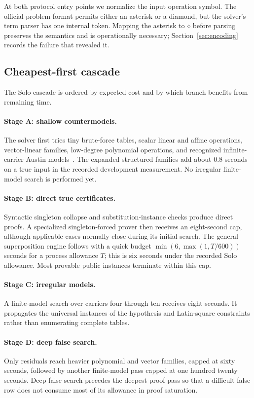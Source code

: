 \documentclass[10pt,twocolumn]{article}
\newcommand{\op}{\mathbin{\diamond}}
\begin{document}
At both protocol entry points we normalize the input operation symbol.  The
official problem format permits either an asterisk or a diamond, but the
solver's term parser has one internal token.  Mapping the asterisk to
$\op$ before parsing preserves the semantics and is operationally necessary;
Section~\ref{sec:encoding} records the failure that revealed it.

\subsection{Cheapest-first cascade}

The Solo cascade is ordered by expected cost and by which branch benefits from
remaining time.

\paragraph{Stage A: shallow countermodels.}
The solver first tries tiny brute-force tables, scalar linear and affine
operations, vector-linear families, low-degree polynomial operations, and
recognized infinite-carrier Austin models~\cite{austin}.  The expanded structured families
add about 0.8 seconds on a true input in the recorded development measurement.
No irregular finite-model search is performed yet.

\paragraph{Stage B: direct true certificates.}
Syntactic singleton collapse and substitution-instance checks produce direct
proofs.  A specialized singleton-forced prover then receives an eight-second
cap, although applicable cases normally close during its initial search.  The
general superposition engine follows with a quick budget
\(
\min(6,\max(1,T/600))
\)
seconds for a process allowance $T$; this is six seconds under the recorded
Solo allowance.  Most provable public instances terminate within this cap.

\paragraph{Stage C: irregular models.}
A finite-model search over carriers four through ten receives eight seconds.
It propagates the universal instances of the hypothesis and Latin-square
constraints rather than enumerating complete tables.

\paragraph{Stage D: deep false search.}
Only residuals reach heavier polynomial and vector families, capped at sixty
seconds, followed by another finite-model pass capped at one hundred twenty
seconds.  Deep false search precedes the deepest proof pass so that a difficult
false row does not consume most of its allowance in proof saturation.
\end{document}

